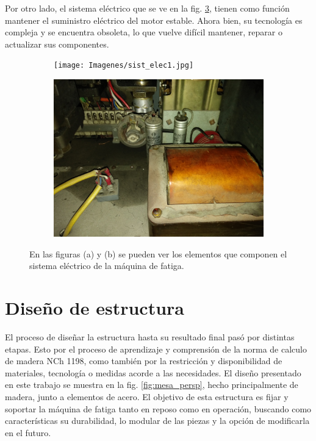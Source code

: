 Por otro lado, el sistema eléctrico que se ve en la fig. \ref{fig:sist_elec}, tienen como función mantener el suministro eléctrico del motor estable. Ahora bien, su tecnología es compleja y se encuentra obsoleta, lo que vuelve difícil mantener, reparar o actualizar sus componentes.

\begin{figure}[h]
\centering
	\begin{subfigure}{0.5\linewidth}
		\centering
		\texttt{[image: Imagenes/sist\_elec1.jpg]}
		\caption{}\label{fig:sist_elect1}
	\end{subfigure}%
	\begin{subfigure}{0.5\linewidth}
		\centering
		\includegraphics[width=0.98\linewidth]{Imagenes/sist_elec2.jpg}
		\caption{}\label{fig:sist_elect2}
	\end{subfigure}%
\caption{En las figuras (a) y (b) se pueden ver los elementos que componen el sistema eléctrico de la máquina de fatiga.}
\label{fig:sist_elec}
\end{figure}
 
\section{Diseño de estructura}
El proceso de diseñar la estructura hasta su resultado final pasó por distintas etapas. Esto por el proceso de aprendizaje y comprensión de la norma de calculo de madera NCh 1198, como también por la restricción y disponibilidad de materiales, tecnología o medidas acorde a las necesidades. El diseño presentado en este trabajo se muestra en la fig. \ref{fig:mesa_persp}, hecho principalmente de madera, junto a elementos de acero. El objetivo de esta estructura es fijar y soportar la máquina de fatiga tanto en reposo como en operación, buscando como características su durabilidad, lo modular de las piezas y la opción de modificarla en el futuro.


